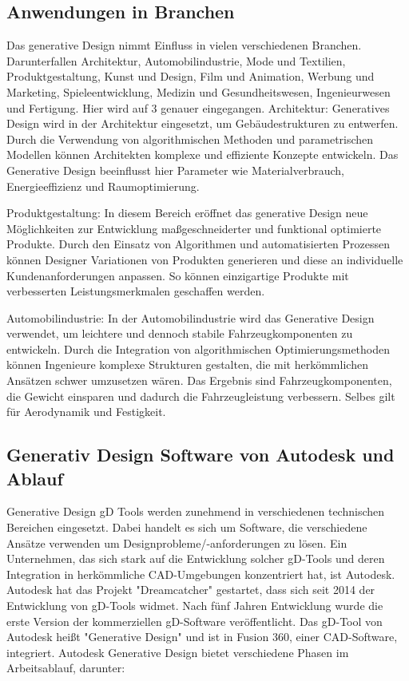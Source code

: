 \subsection*{Anwendungen in Branchen}
Das generative Design nimmt Einfluss in vielen verschiedenen Branchen. Darunterfallen Architektur, Automobilindustrie, Mode und Textilien, Produktgestaltung, Kunst und Design, Film und Animation, Werbung und Marketing, Spieleentwicklung, Medizin und Gesundheitswesen, Ingenieurwesen und Fertigung. Hier wird auf 3 genauer eingegangen.
Architektur: Generatives Design wird in der Architektur eingesetzt, um Gebäudestrukturen zu entwerfen. Durch die Verwendung von algorithmischen Methoden und parametrischen Modellen können Architekten komplexe und effiziente Konzepte entwickeln. Das Generative Design beeinflusst hier Parameter wie Materialverbrauch, Energieeffizienz und Raumoptimierung. 

Produktgestaltung: In diesem Bereich eröffnet das generative Design neue Möglichkeiten zur Entwicklung maßgeschneiderter und funktional optimierte Produkte. Durch den Einsatz von Algorithmen und automatisierten Prozessen können Designer Variationen von Produkten generieren und diese an individuelle Kundenanforderungen anpassen. So können einzigartige Produkte mit verbesserten Leistungsmerkmalen geschaffen werden. 

Automobilindustrie: In der Automobilindustrie wird das Generative Design verwendet, um leichtere und dennoch stabile Fahrzeugkomponenten zu entwickeln. Durch die Integration von algorithmischen Optimierungsmethoden können Ingenieure komplexe Strukturen gestalten, die mit herkömmlichen Ansätzen schwer umzusetzen wären. Das Ergebnis sind Fahrzeugkomponenten, die Gewicht einsparen und dadurch die Fahrzeugleistung verbessern. Selbes gilt für Aerodynamik und Festigkeit. \autocite*{8} \autocite{9}
\subsection*{Generativ Design Software von Autodesk und Ablauf}

Generative Design \ac*{gD} Tools werden zunehmend in verschiedenen technischen Bereichen eingesetzt. Dabei handelt es sich um Software, die verschiedene Ansätze verwenden um Designprobleme/-anforderungen zu lösen. Ein Unternehmen, das sich stark auf die Entwicklung solcher \ac*{gD}-Tools und deren Integration in herkömmliche \ac*{CAD}-Umgebungen konzentriert hat, ist Autodesk. Autodesk hat das Projekt "Dreamcatcher" gestartet, dass sich seit 2014 der Entwicklung von \ac*{gD}-Tools widmet. Nach fünf Jahren Entwicklung wurde die erste Version der kommerziellen \ac*{gD}-Software veröffentlicht. Das \ac*{gD}-Tool von Autodesk heißt "Generative Design" und ist in Fusion 360, einer \ac*{CAD}-Software, integriert.
Autodesk Generative Design bietet verschiedene Phasen im Arbeitsablauf, darunter:


